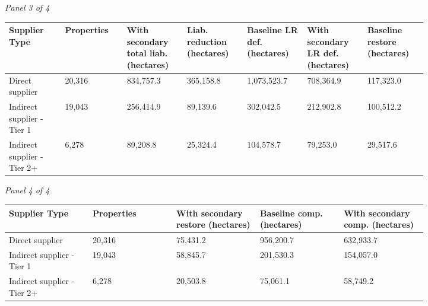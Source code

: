 \documentclass[12pt]{article}
\begin{document}
\begin{landscape}
\begin{table}[H]
\textit{Panel 3 of 4}\\[2pt]
{\fontsize{12}{14}\selectfont
\setlength{\tabcolsep}{3pt}
\renewcommand{\arraystretch}{1.08}
\begin{tabular}{p{0.117\linewidth}p{0.117\linewidth}p{0.117\linewidth}p{0.117\linewidth}p{0.117\linewidth}p{0.117\linewidth}p{0.117\linewidth}}
\toprule
Supplier Type & Properties & With secondary total liab. (hectares) & Liab. reduction (hectares) & Baseline LR def. (hectares) & With secondary LR def. (hectares) & Baseline restore (hectares) \\
\midrule
Direct supplier & 20,316 & 834,757.3 & 365,158.8 & 1,073,523.7 & 708,364.9 & 117,323.0 \\
Indirect supplier - Tier 1 & 19,043 & 256,414.9 & 89,139.6 & 302,042.5 & 212,902.8 & 100,512.2 \\
Indirect supplier - Tier 2+ & 6,278 & 89,208.8 & 25,324.4 & 104,578.7 & 79,253.0 & 29,517.6 \\
\bottomrule
\end{tabular}
}

\vspace{0.6em}

\textit{Panel 4 of 4}\\[2pt]
{\fontsize{12}{14}\selectfont
\setlength{\tabcolsep}{3pt}
\renewcommand{\arraystretch}{1.08}
\begin{tabular}{p{0.164\linewidth}p{0.164\linewidth}p{0.164\linewidth}p{0.164\linewidth}p{0.164\linewidth}}
\toprule
Supplier Type & Properties & With secondary restore (hectares) & Baseline comp. (hectares) & With secondary comp. (hectares) \\
\midrule
Direct supplier & 20,316 & 75,431.2 & 956,200.7 & 632,933.7 \\
Indirect supplier - Tier 1 & 19,043 & 58,845.7 & 201,530.3 & 154,057.0 \\
Indirect supplier - Tier 2+ & 6,278 & 20,503.8 & 75,061.1 & 58,749.2 \\
\bottomrule
\end{tabular}
}
\end{table}
\end{landscape}
\end{document}
